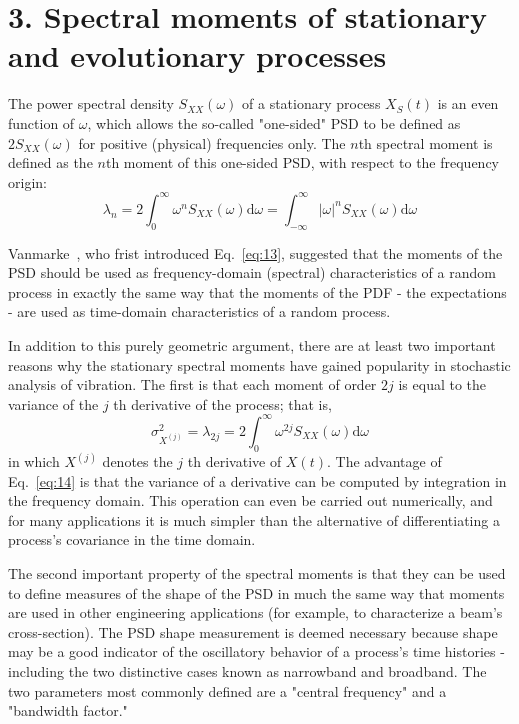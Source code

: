 \documentclass[12pt]{article}
\begin{document}
\section*{3. Spectral moments of stationary and evolutionary processes}

The power spectral density $S_{X X}(\omega)$ of a stationary process $X_{S}(t)$ is an even function of $\omega$, which allows the so-called "one-sided" PSD to be defined as $2 S_{X X}(\omega)$ for positive (physical) frequencies only. The $n$th spectral moment is defined as the $n$th moment of this one-sided PSD, with respect to the frequency origin:
\begin{equation}
\lambda_{n}=2 \int_{0}^{\infty} \omega^{n} S_{X X}(\omega) \mathrm{d} \omega=\int_{-\infty}^{\infty}|\omega|^{n} S_{X X}(\omega) \mathrm{d} \omega
\label{eq:13}
\end{equation}

Vanmarke~\cite{Vanmarke1972}, who frist introduced Eq.~\eqref{eq:13}, suggested that the moments of the PSD should be used as frequency-domain (spectral) characteristics of a random process in exactly the same way that the moments of the PDF - the expectations - are used as time-domain characteristics of a random process.

In addition to this purely geometric argument, there are at least two important reasons why the stationary spectral moments have gained popularity in stochastic analysis of vibration. The first is that each moment of order $2 j$ is equal to the variance of the $j$ th derivative of the process; that is,
\begin{equation}
\sigma_{X^{(j)}}^{2}=\lambda_{2 j}=2 \int_{0}^{\infty} \omega^{2 j} S_{X X}(\omega) \mathrm{d} \omega
\label{eq:14}
\end{equation}
in which $X^{(j)}$ denotes the $j$ th derivative of $X(t)$. The advantage of Eq.~\eqref{eq:14} is that the variance of a derivative can be computed by integration in the frequency domain. This operation can even be carried out numerically, and for many applications it is much simpler than the alternative of differentiating a process's covariance in the time domain.

The second important property of the spectral moments is that they can be used to define measures of the shape of the PSD in much the same way that moments are used in other engineering applications (for example, to characterize a beam's cross-section). The PSD shape measurement is deemed necessary because shape may be a good indicator of the oscillatory behavior of a process's time histories - including the two distinctive cases known as narrowband and broadband. The two parameters most commonly defined are a "central frequency" and a "bandwidth factor."
\end{document}

